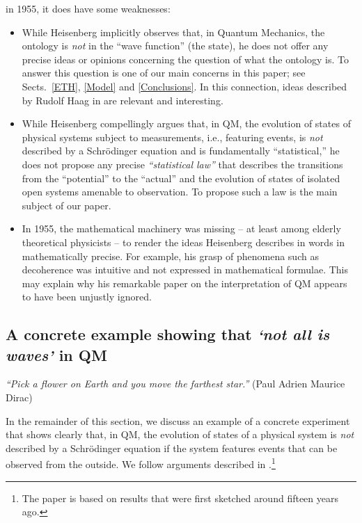 \documentclass[12pt]{article}
\begin{document}
in 1955, it does have some weaknesses: 
\begin{itemize}
\item{While Heisenberg implicitly observes that, in Quantum Mechanics, the ontology is \textit{not} in 
the ``wave function'' (the state), he does not offer any precise ideas or opinions concerning the question of 
what the ontology is. To answer this question is one of our main concerns in this paper; see Sects.~\ref{ETH}, \ref{Model} 
and \ref{Conclusions}. In this connection, ideas described by {Rudolf Haag} in \cite{Rudolf} are relevant and 
interesting.}
\item{While Heisenberg compellingly argues that, in QM, the evolution of states of physical systems subject to 
measurements, i.e., featuring events, is \textit{not} described by a Schr\"odinger equation and is fundamentally 
``statistical,'' he does not propose any precise \textit{``statistical law''} that describes the transitions from the 
``potential'' to the ``actual'' and the evolution of states of isolated open systems amenable to observation. 
To propose such a law is the main subject of our paper.}
\item{In 1955, the mathematical machinery was missing -- at least among elderly theoretical physicists -- 
to render the ideas Heisenberg describes in words in \cite{Heisenberg} mathematically precise. 
For example, his grasp of phenomena such as decoherence was intuitive and not expressed in 
mathematical formulae. This may explain why his remarkable paper on the interpretation of QM 
appears to have been unjustly ignored.}
\end{itemize}

\subsection{A concrete example showing that \textit{`not all is waves'} in QM}
\hspace{0.5cm} \textit{``Pick a flower on Earth and you move the farthest star.''} (Paul Adrien Maurice Dirac)

In the remainder of this section, we discuss an example of a concrete experiment that shows clearly that, in QM, the evolution 
of states of a physical system is \textit{not} described by a Schr\"odinger equation if the system features events that can be
observed from the outside. We follow arguments described in 
\cite{FFS, Schill}.\footnote{The paper \cite{FFS} is based on results that were first sketched around fifteen years ago.} \\
\end{document}
